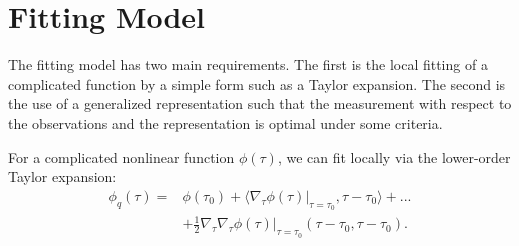 \documentclass{article}
\theoremstyle{remark}
\begin{document}
%
\section{Fitting Model}
The fitting model has two main requirements. The first is the local fitting of a complicated function by a simple form such as a Taylor expansion. The second is the use of a generalized representation such that the measurement with respect to the observations and the representation is optimal under some criteria.  

For a complicated nonlinear function $\phi(\tau)$, we can fit locally via the lower-order Taylor expansion:
\begin{equation}\label{quadratic_f}
\begin{aligned}
\phi_q(\tau) = &\phi(\tau_0) + \langle \nabla_\tau \phi(\tau)|_{\tau=\tau_0}, \tau-\tau_0 \rangle +...\\
&+ \frac{1}{2} \nabla_\tau \nabla_\tau \phi(\tau)|_{\tau=\tau_0} (\tau-\tau_0,\tau-\tau_0).
\end{aligned}
\end{equation}
\end{document}
